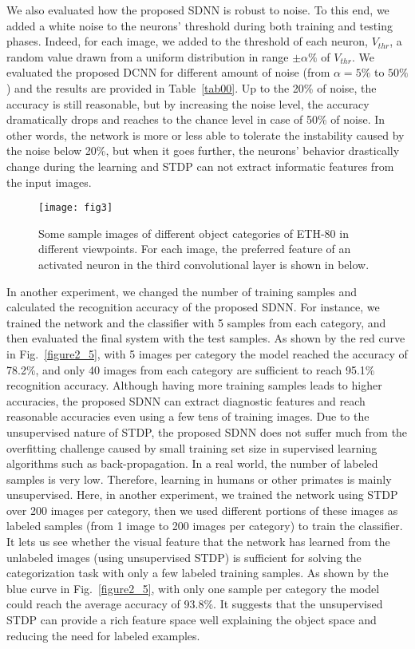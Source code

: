 \documentclass[preprint,5p,12pt,twocolumn]{article}
\begin{document}
We also evaluated how the proposed SDNN is robust to noise.  To this end, we added a white noise to the neurons' threshold during both training and testing phases. Indeed, for each image, we added to the threshold of each neuron, $V_{thr}$, a random value drawn from a uniform distribution in range $\pm \alpha\%$ of $V_{thr}$. We evaluated the proposed DCNN for different amount of noise (from  $\alpha=5\%$ to $50\%$) and the results are provided in Table~\ref{tab00}. Up to the 20\% of noise, the accuracy is still reasonable, but by increasing the noise level, the accuracy dramatically drops and reaches to the chance level in case of 50\% of noise. In other words, the network is more or less able to tolerate the instability caused by the noise below 20\%, but when it goes further, the neurons' behavior drastically change during the learning  and STDP can not extract informatic features from the input images. 




\begin{figure*}[!tb]
\centering
\texttt{[image: fig3]}
\caption{ Some sample images of different object categories of ETH-80 in different viewpoints. For each image, the preferred feature of an activated neuron in the third convolutional layer is shown in below.}
\label{figure3}
\end{figure*}

In another experiment, we changed the number of training samples and calculated the recognition accuracy of the proposed SDNN. For instance, we trained the network and the classifier with 5 samples from each category, and then evaluated the final system with the test samples. As shown by the red curve in Fig.~\ref{figure2_5}, with 5 images per category the model reached the accuracy of 78.2\%, and only 40 images from each category are sufficient to reach 95.1\% recognition accuracy. Although having more training samples leads to higher accuracies, the proposed SDNN can extract diagnostic features and reach reasonable accuracies even using a few tens of training images.  Due to the unsupervised nature of STDP, the proposed SDNN does not suffer much from the overfitting challenge caused by small training set size in supervised learning algorithms such as back-propagation. In a real world, the number of labeled samples is very low. Therefore, learning in humans or other primates is mainly unsupervised. Here, in another experiment, we trained the network using STDP over 200 images per category, then we used different portions of these images as labeled samples (from 1 image to 200 images per category) to train the classifier. It lets us see whether the visual feature that the network has learned from the unlabeled images (using unsupervised STDP)  is sufficient for solving the categorization task with only a few labeled training samples. As shown by the blue curve in Fig.~\ref{figure2_5}, with only one sample per category the model could reach the average accuracy of 93.8\%. It suggests that the unsupervised STDP can provide a rich feature space well explaining the object space and reducing the need for labeled examples. 
\end{document}
